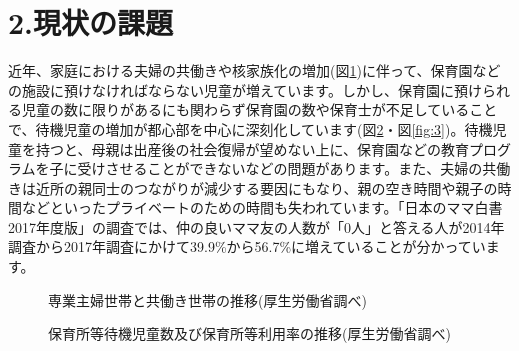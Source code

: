 \documentclass[a4j,titlepage]{jarticle}
\begin{document}
\section{2.現状の課題}
近年、家庭における夫婦の共働きや核家族化の増加(図\ref{fig:1})\cite{bib:tomo}に伴って、保育園などの施設に預けなければならない児童が増えています。しかし、保育園に預けられる児童の数に限りがあるにも関わらず保育園の数や保育士が不足していることで、待機児童の増加が都心部を中心に深刻化しています(図\ref{fig:2}・図\ref{fig:3})\cite{bib:taiki}。待機児童を持つと、母親は出産後の社会復帰が望めない上に、保育園などの教育プログラムを子に受けさせることができないなどの問題があります。また、夫婦の共働きは近所の親同士のつながりが減少する要因にもなり、親の空き時間や親子の時間などといったプライベートのための時間も失われています。「日本のママ白書2017年度版」\cite{bib:mama}の調査では、仲の良いママ友の人数が「0人」と答える人が2014年調査から2017年調査にかけて39.9\%から56.7\%に増えていることが分かっています。

\begin{figure}[H]
\begin{center}
\caption{専業主婦世帯と共働き世帯の推移(厚生労働省調べ)}
\label{fig:1}
\end{center}
\end{figure}

\begin{figure}[H]
\begin{center}
\caption{保育所等待機児童数及び保育所等利用率の推移(厚生労働省調べ)}
\label{fig:2}
\end{center}
\end{figure}
\end{document}
